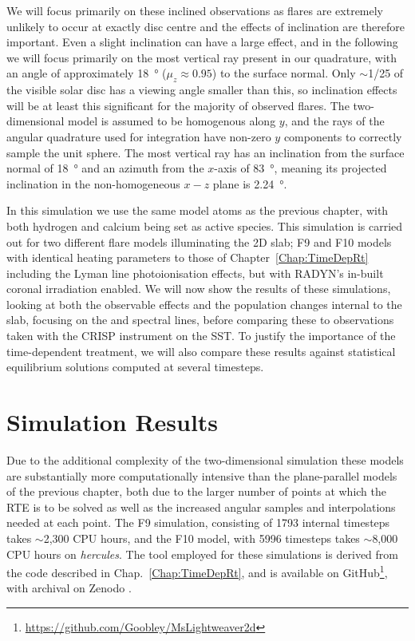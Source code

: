 We will focus primarily on these inclined observations as flares are extremely unlikely to occur at exactly disc centre and the effects of inclination are therefore important.
Even a slight inclination can have a large effect, and in the following we will focus primarily on the most vertical ray present in our quadrature, with an angle of approximately \SI{18}{\degree} ($\mu_z\approx0.95$) to the surface normal.
Only $\sim$1/25 of the visible solar disc has a viewing angle smaller than this, so inclination effects will be at least this significant for the majority of observed flares.
The two-dimensional model is assumed to be homogenous along $y$, and the rays of the angular quadrature used for integration have non-zero $y$ components to correctly sample the unit sphere.
The most vertical ray has an inclination from the surface normal of \SI{18}{\degree} and an azimuth from the $x$-axis of \SI{83}{\degree}, meaning its projected inclination in the non-homogeneous $x-z$ plane is \SI{2.24}{\degree}.

In this simulation we use the same model atoms as the previous chapter, with both hydrogen and calcium being set as active species.
This simulation is carried out for two different flare models illuminating the 2D slab; F9 and F10 models with identical heating parameters to those of Chapter~\ref{Chap:TimeDepRt} including the Lyman line photoionisation effects, but with RADYN's in-built coronal irradiation enabled.
We will now show the results of these simulations, looking at both the observable effects and the population changes internal to the slab, focusing on the \Ha{} and \CaLine{} spectral lines, before comparing these to observations taken with the CRISP instrument on the SST.
To justify the importance of the time-dependent treatment, we will also compare these results against statistical equilibrium solutions computed at several timesteps.


\section{Simulation Results}\label{Sec:2dSimResults}

Due to the additional complexity of the two-dimensional simulation these models are substantially more computationally intensive than the plane-parallel models of the previous chapter, both due to the larger number of points at which the RTE is to be solved as well as the increased angular samples and interpolations needed at each point.
The F9 simulation, consisting of 1793 internal timesteps takes $\sim$2,300 CPU hours, and the F10 model, with 5996 timesteps takes $\sim$8,000 CPU hours on \emph{hercules}.
The tool employed for these simulations is derived from the code described in Chap.~\ref{Chap:TimeDepRt}, and is available on GitHub\footnote{\url{https://github.com/Goobley/MsLightweaver2d}}, with archival on Zenodo \citep{MsLw2dThesisRelease}.

